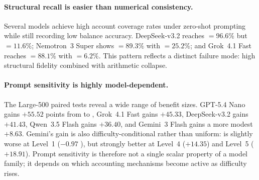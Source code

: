 \paragraph{Structural recall is easier than numerical consistency.}
Several models achieve high account coverage rates under zero-shot
prompting while still recording low balance accuracy.
DeepSeek-v3.2 \zs{} reaches \acr{} \(=96.6\%\) but \ba{} \(=11.6\%\);
Nemotron~3 Super \zs{} shows \acr{} \(=89.3\%\) with \ba{} \(=25.2\%\);
and Grok~4.1 Fast \zs{} reaches \acr{} \(=88.1\%\) with \ba{}
\(=6.2\%\).
This pattern reflects a distinct failure mode: high structural fidelity
combined with arithmetic collapse.

\paragraph{Prompt sensitivity is highly model-dependent.}
The Large-500 paired tests reveal a wide range of \CoT{} benefit sizes.
GPT-5.4 Nano gains \(+55.52\) \fbs{} points from \zs{} to \CoT{},
Grok~4.1 Fast gains \(+45.33\), DeepSeek-v3.2 gains \(+41.43\),
Qwen~3.5 Flash gains \(+36.40\), and Gemini~3 Flash gains a more
modest \(+8.63\).
Gemini's gain is also difficulty-conditional rather than uniform:
\CoT{} is slightly worse at Level~1 (\(-0.97\) \fbs{}), but strongly
better at Level~4 (\(+14.35\)) and Level~5 (\(+18.91\)).
Prompt sensitivity is therefore not a single scalar property of a model
family; it depends on which accounting mechanisms become active as
difficulty rises.
